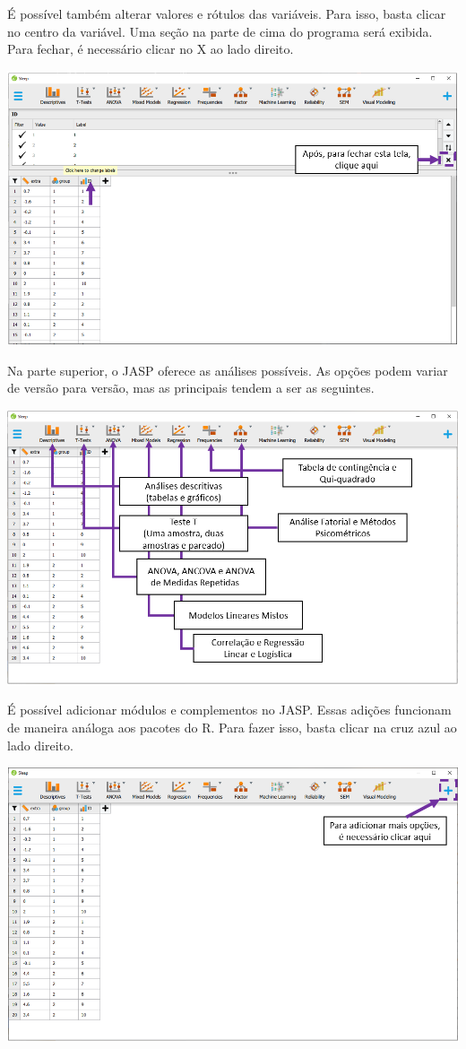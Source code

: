 \documentclass[
]{book}
\begin{document}
É possível também alterar valores e rótulos das variáveis. Para isso,
basta clicar no centro da variável. Uma seção na parte de cima do
programa será exibida. Para fechar, é necessário clicar no X ao lado
direito.

\includegraphics{./img/cap_jasp_alterar_valores.png}

Na parte superior, o JASP oferece as análises possíveis. As opções podem
variar de versão para versão, mas as principais tendem a ser as
seguintes.

\includegraphics{./img/cap_jasp_features.png}

É possível adicionar módulos e complementos no JASP. Essas adições
funcionam de maneira análoga aos pacotes do R. Para fazer isso, basta
clicar na cruz azul ao lado direito.

\includegraphics{./img/cap_jasp_adicionar_modulos.png}
\end{document}
